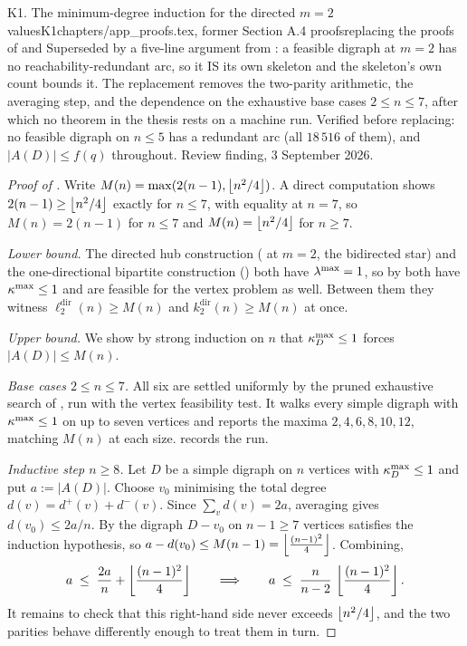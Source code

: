 \begin{offcut}{K1. The minimum-degree induction for the directed $m=2$ values}{K1}{chapters/app\_proofs.tex, former Section A.4 proofs}{replacing the proofs of  and }{Superseded by a five-line argument from : a feasible digraph at $m=2$ has no reachability-redundant arc, so it IS its own skeleton and the skeleton's own count bounds it. The replacement removes the two-parity arithmetic, the averaging step, and the dependence on the exhaustive base cases $2 \le n \le 7$, after which no theorem in the thesis rests on a machine run. Verified before replacing: no feasible digraph on $n \le 5$ has a redundant arc (all $18\,516$ of them), and $|A(D)| \le f(q)$ throughout. Review finding, 3 September 2026.}

\begin{proof}[Proof of \aimedal]
Write $M(n) = \max(2(n-1), \left\lfloor n^2/4 \right\rfloor)$. A direct computation shows $2(n-1) \ge \left\lfloor n^2/4 \right\rfloor$ exactly for $n \le 7$, with equality at $n = 7$, so $M(n) = 2(n-1)$ for $n \le 7$ and $M(n) = \left\lfloor n^2/4 \right\rfloor$ for $n \ge 7$.

\emph{Lower bound.} The directed hub construction ( at $m = 2$, the bidirected star) and the one-directional bipartite construction () both have $\lambda^{\max} = 1$, so by  both have $\kappa^{\max} \le 1$ and are feasible for the vertex problem as well. Between them they witness $\ell_2^{\mathrm{dir}}(n) \ge M(n)$ and $k_2^{\mathrm{dir}}(n) \ge M(n)$ at once.

\emph{Upper bound.} We show by strong induction on $n$ that $\kappa^{\max}_D \le 1$ forces $|A(D)| \le M(n)$.

\emph{Base cases $2 \le n \le 7$.} All six are settled uniformly by the pruned exhaustive search of , run with the vertex feasibility test. It walks every simple digraph with $\kappa^{\max} \le 1$ on up to seven vertices and reports the maxima $2, 4, 6, 8, 10, 12$, matching $M(n)$ at each size.  records the run.

\emph{Inductive step $n \ge 8$.} Let $D$ be a simple digraph on $n$ vertices with $\kappa^{\max}_D \le 1$ and put $a := |A(D)|$. Choose $v_0$ minimising the total degree $d(v) = d^+(v) + d^-(v)$. Since $\sum_v d(v) = 2a$, averaging gives $d(v_0) \le 2a/n$. By  the digraph $D - v_0$ on $n-1 \ge 7$ vertices satisfies the induction hypothesis, so $a - d(v_0) \le M(n-1) = \left\lfloor \frac{(n-1)^2}{4} \right\rfloor$. Combining,
\[
a \;\le\; \frac{2a}{n} + \left\lfloor \frac{(n-1)^2}{4} \right\rfloor
\qquad\Longrightarrow\qquad
a \;\le\; \frac{n}{n-2} \, \left\lfloor \frac{(n-1)^2}{4} \right\rfloor.
\]
It remains to check that this right-hand side never exceeds $\left\lfloor n^2/4 \right\rfloor$, and the two parities behave differently enough to treat them in turn.


\end{proof}
\end{offcut}
